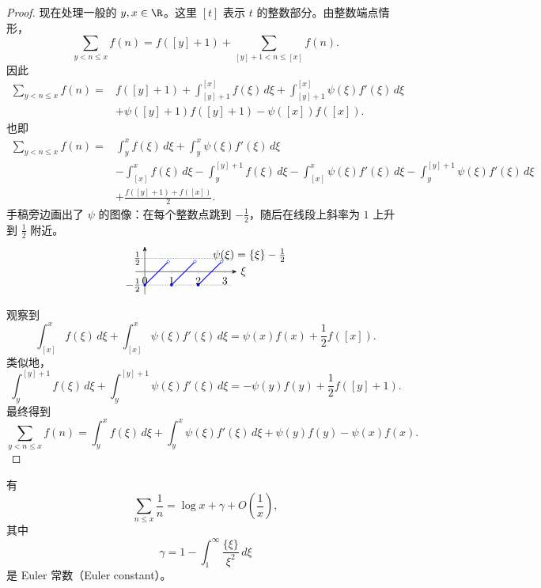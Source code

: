 \begin{proof}
	现在处理一般的 $y,x\in\R$。这里 $[t]$ 表示 $t$ 的整数部分。由整数端点情形，
	\[
		\sum_{y<n\leq x}f(n)
		=
		f([y]+1)+\sum_{[y]+1<n\leq [x]}f(n).
	\]
	因此
	\[
	\begin{aligned}
		\sum_{y<n\leq x}f(n)
		={}&f([y]+1)
		+\int_{[y]+1}^{[x]}f(\xi)\,d\xi
		+\int_{[y]+1}^{[x]}\psi(\xi)f'(\xi)\,d\xi \\
		&+\psi([y]+1)f([y]+1)-\psi([x])f([x]).
	\end{aligned}
	\]
	也即
	\[
	\begin{aligned}
		\sum_{y<n\leq x}f(n)
		={}&
		\int_y^x f(\xi)\,d\xi
		+\int_y^x \psi(\xi)f'(\xi)\,d\xi \\
		&-\int_{[x]}^x f(\xi)\,d\xi
		-\int_y^{[y]+1}f(\xi)\,d\xi
		-\int_{[x]}^x\psi(\xi)f'(\xi)\,d\xi
		-\int_y^{[y]+1}\psi(\xi)f'(\xi)\,d\xi \\
		&+\frac{f([y]+1)+f([x])}{2}.
	\end{aligned}
	\]
	手稿旁边画出了 $\psi$ 的图像：在每个整数点跳到 $-\frac12$，随后在线段上斜率为 $1$ 上升到 $\frac12$ 附近。
	\[
	\begin{tikzpicture}[scale=0.85, >=Stealth]
		\draw[->] (-0.35,0) -- (3.45,0) node[right] {$\xi$};
		\draw[->] (0,-0.85) -- (0,0.95);
		\draw[densely dotted] (-0.15,0.5) -- (3.25,0.5);
		\draw[densely dotted] (-0.15,-0.5) -- (3.25,-0.5);
		\node[left] at (0,0.5) {$\frac12$};
		\node[left] at (0,-0.5) {$-\frac12$};
		\foreach \k in {0,1,2} {
			\draw[blue, thick] (\k,-0.5) -- ({\k+0.88},0.38);
			\fill[blue] (\k,-0.5) circle (1.4pt);
			\draw[blue, fill=white] ({\k+0.88},0.38) circle (1.4pt);
			\draw[gray!55] (\k,-0.06) -- (\k,0.06) node[below=3pt, black] {$\k$};
		}
		\draw[gray!55] (3,-0.06) -- (3,0.06) node[below=3pt, black] {$3$};
		\node[right] at (2.4,0.62) {$\psi(\xi)=\{\xi\}-\frac12$};
	\end{tikzpicture}
	\]
	观察到
	\[
		\int_{[x]}^x f(\xi)\,d\xi
		+
		\int_{[x]}^x\psi(\xi)f'(\xi)\,d\xi
		=
		\psi(x)f(x)+\frac12 f([x]).
	\]
	类似地，
	\[
		\int_y^{[y]+1} f(\xi)\,d\xi
		+
		\int_y^{[y]+1}\psi(\xi)f'(\xi)\,d\xi
		=
		-\psi(y)f(y)+\frac12 f([y]+1).
	\]
	最终得到
	\[
		\sum_{y<n\leq x}f(n)
		=
		\int_y^x f(\xi)\,d\xi
		+
		\int_y^x \psi(\xi)f'(\xi)\,d\xi
		+
		\psi(y)f(y)-\psi(x)f(x).
	\]
\end{proof}

\begin{corollary}[原文 Corollary 1]
	有
	\[
		\sum_{n\leq x}\frac1n
		=
		\log x+\gamma+O\left(\frac1x\right),
	\]
	其中
	\[
		\gamma
		=
		1-\int_1^\infty\frac{\{\xi\}}{\xi^2}\,d\xi
	\]
	是 Euler 常数（Euler constant）。
\end{corollary}

